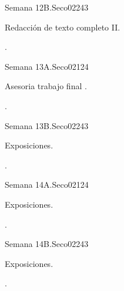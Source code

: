 \begin{syllabus}
\begin{unit}{}{Semana 12B.}{Seco02}{24}{3}
   \begin{topics}
      \item Redacción de texto completo  II.
   \end{topics}

   \begin{learningoutcomes}
      \item .
      \end{learningoutcomes}
\end{unit}

\begin{unit}{}{Semana 13A.}{Seco02}{12}{4}
   \begin{topics}
      \item Asesoria trabajo final .
   \end{topics}
   \begin{learningoutcomes}
      \item .
   \end{learningoutcomes}
\end{unit}

\begin{unit}{}{Semana 13B.}{Seco02}{24}{3}
   \begin{topics}
      \item Exposiciones.
   \end{topics}

   \begin{learningoutcomes}
      \item .
      \end{learningoutcomes}
\end{unit}

\begin{unit}{}{Semana 14A.}{Seco02}{12}{4}
   \begin{topics}
      \item Exposiciones.
   \end{topics}
   \begin{learningoutcomes}
      \item .
   \end{learningoutcomes}
\end{unit}

\begin{unit}{}{Semana 14B.}{Seco02}{24}{3}
   \begin{topics}
      \item Exposiciones.
   \end{topics}

   \begin{learningoutcomes}
      \item .
      \end{learningoutcomes}
\end{unit}


\end{syllabus}
